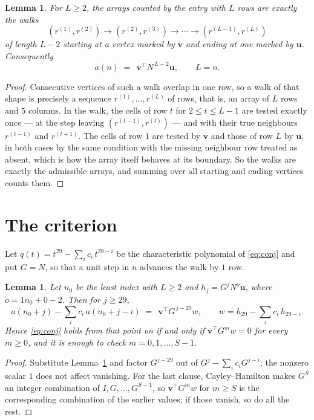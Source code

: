 \documentclass[11pt,a4paper]{article}
\theoremstyle{plain}
\newtheorem{lemma}[theorem]{Lemma}
\theoremstyle{definition}
\begin{document}
\begin{lemma}\label{lem:walk}
For $L\ge2$, the arrays counted by the entry with $L$ rows are exactly the walks
\[
(r^{(1)},r^{(2)})\to(r^{(2)},r^{(3)})\to\cdots\to(r^{(L-1)},r^{(L)})
\]
of length $L-2$ starting at a vertex marked by $\mathbf{v}$ and ending at one marked by
$\mathbf{u}$. Consequently
\[
a(n)\;=\;\,\mathbf{v}^{\!\top}N^{\,L-2}\mathbf{u},\qquad L=n .
\]
\end{lemma}

\begin{proof}
Consecutive vertices of such a walk overlap in one row, so a walk of that shape is
precisely a sequence $r^{(1)},\dots,r^{(L)}$ of rows, that is, an array of $L$ rows
and $5$ columns. In the walk, the cells of row $t$ for $2\le t\le L-1$ are tested
exactly once --- at the step leaving $(r^{(t-1)},r^{(t)})$ --- and with their true
neighbours $r^{(t-1)}$ and $r^{(t+1)}$. The cells of row $1$ are tested by
$\mathbf{v}$ and those of row $L$ by $\mathbf{u}$, in both cases by the same condition
with the missing neighbour row treated as absent, which is how the array itself behaves at
its boundary. So the walks are exactly the admissible arrays, and summing over all starting
and ending vertices counts them.
\end{proof}

\section{The criterion}

Let $q(t)=t^{29}-\sum_i c_i\,t^{29-i}$ be the characteristic polynomial of
\eqref{eq:conj} and put $G=N$, so that a unit step in $n$ advances the walk by
$1$ row.

\begin{lemma}\label{lem:crit}
Let $n_0$ be the least index with $L\ge2$ and $h_j=G^{j}N^{o}\mathbf{u}$, where
$o=1n_0+0-2$. Then for $j\ge29$,
\[
a(n_0+j)-\sum_i c_i\,a(n_0+j-i)\;=\;\,\mathbf{v}^{\!\top}G^{\,j-29}w,
\qquad w=h_{29}-\sum_i c_i\,h_{29-i} .
\]
Hence \eqref{eq:conj} holds from that point on if and only if
$\mathbf{v}^{\!\top}G^{m}w=0$ for every $m\ge0$, and it is enough to check
$m=0,1,\dots,S-1$.
\end{lemma}

\begin{proof}
Substitute Lemma~\ref{lem:walk} and factor $G^{j-29}$ out of
$G^{j}-\sum_ic_iG^{j-i}$; the nonzero scalar $1$ does not affect
vanishing. For the last clause, Cayley--Hamilton makes $G^{S}$ an integer combination of
$I,G,\dots,G^{S-1}$, so $\mathbf{v}^{\!\top}G^{m}w$ for $m\ge S$ is the corresponding
combination of the earlier values; if those vanish, so do all the rest.
\end{proof}
\end{document}

